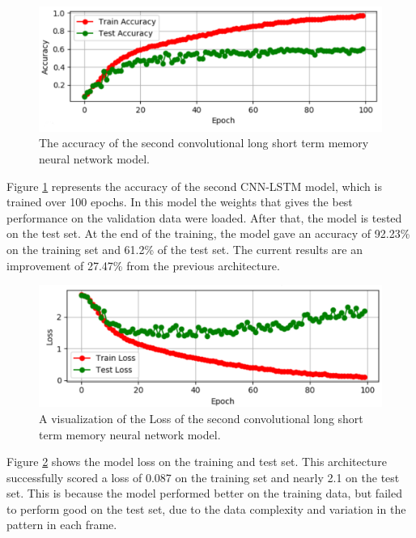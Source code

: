 \begin{figure}[ht]
\centering
\includegraphics[width=1.0\columnwidth]{Figures/accuracycnnlstmmodel}
\decoRule
\caption[The accuracy of the second convolutional long short term memory neural network model.]{The accuracy of the second convolutional long short term memory neural network model.}
\label{fig:accuracycnnlstmmodel} 
\end{figure}

Figure \ref{fig:accuracycnnlstmmodel} represents the accuracy of the second CNN-LSTM model, which is trained over 100 epochs. In this model the weights that gives the best performance on the validation data were loaded. After that, the model is tested on the test set. At the end of the training, the model gave an accuracy of 92.23\% on the training set and 61.2\% of the test set. The current results are an improvement of 27.47\% from the previous architecture.

\begin{figure}[ht]
\centering
\includegraphics[width=1.0\columnwidth]{Figures/losscnnlstmmodel}
\decoRule
\caption[A visualization of the Loss of the second convolutional long short term memory neural network model.]{A visualization of the Loss of the second convolutional long short term memory neural network model.}
\label{fig:losscnnlstmmodel}
\end{figure}

Figure \ref{fig:losscnnlstmmodel} shows the model loss on the training and test set. This architecture successfully scored a loss of 0.087 on the training set and nearly 2.1 on the test set. This is because the model performed better on the training data, but failed to perform good on the test set, due to the data complexity and variation in the pattern in each frame.\\

